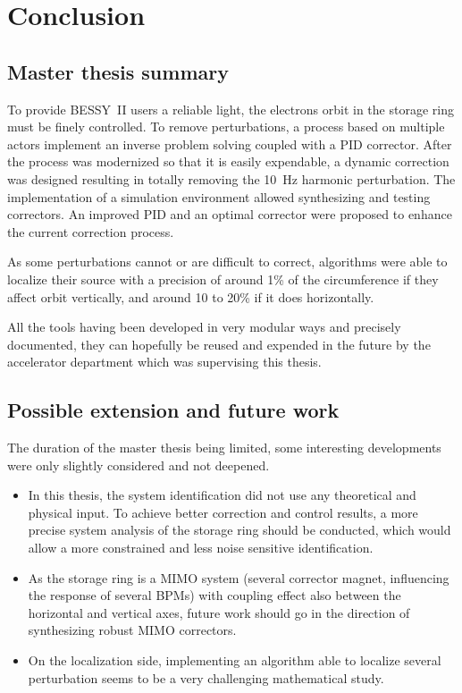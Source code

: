
\chapter{Conclusion}
\label{sec:conclusion}
\section{Master thesis summary}
To provide BESSY~II users a reliable light, the electrons orbit in the storage ring must be finely controlled. To remove perturbations, a process based on multiple actors implement an inverse problem solving coupled with a PID corrector. After the process was modernized so that it is easily expendable, a dynamic correction was designed resulting in totally removing the \SI{10}{\hertz} harmonic perturbation. The implementation of a simulation environment allowed synthesizing and testing correctors. An improved PID and an optimal corrector were proposed to enhance the current correction process.

As some perturbations cannot or are difficult to correct, algorithms were able to localize their source with a precision of around 1\% of the circumference if they affect orbit vertically, and around 10 to 20\% if it does horizontally.

All the tools having been developed in very modular ways and precisely documented, they can hopefully be reused and expended in the future by the accelerator department which was supervising this thesis.

\section{Possible extension and future work}

The duration of the master thesis being limited, some interesting developments were only slightly considered and not deepened.

\begin{itemize}
    \item In this thesis, the system identification did not use any theoretical and physical input. To achieve better correction and control results, a more precise system analysis of the storage ring should be conducted, which would allow a more constrained and less noise sensitive identification.
    \item As the storage ring is a MIMO system (several corrector magnet, influencing the response of several BPMs) with coupling effect also between the horizontal and vertical axes, future work should go in the direction of synthesizing robust MIMO correctors.
    \item On the localization side, implementing an algorithm able to localize several perturbation seems to be a very challenging mathematical study.
\end{itemize}